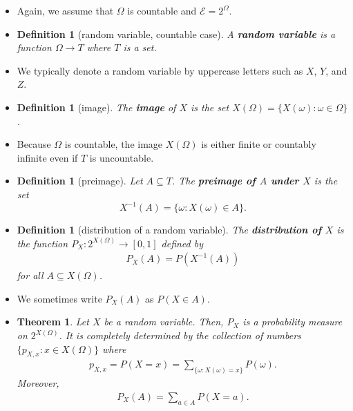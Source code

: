 \documentclass[10pt]{article}
\newtheorem{theorem}[lemma]{Theorem}
\newtheorem{definition}[lemma]{Definition}
\numberwithin{lemma}{section}
\newcommand{\mcal}[1]{\mathcal{#1}}
\begin{document}
\begin{itemize}
  \item Again, we assume that $\Omega$ is countable and $\mcal{E} = 2^\Omega$.

  \item \begin{definition}[random variable, countable case]
    A {\bf random variable} is a function $\Omega \rightarrow T$ where $T$ is a set.
  \end{definition}

  \item We typically denote a random variable by uppercase letters such as $X$, $Y$, and $Z$.
  
  \item \begin{definition}[image]
    The {\bf image} of $X$ is the set $X(\Omega) = \{ X(\omega) : \omega \in \Omega \}$.
  \end{definition}
  
  \item Because $\Omega$ is countable, the image $X(\Omega)$ is either finite or countably infinite even if $T$ is uncountable.
  
  \item \begin{definition}[preimage]
    Let $A \subseteq T$. The {\bf preimage of $A$ under $X$} is the set $$X^{-1}(A) = \{ \omega : X(\omega) \in A \}.$$
  \end{definition}

  \item \begin{definition}[distribution of a random variable]
    The {\bf distribution of $X$} is the function $P_X: 2^{X(\Omega)} \rightarrow [0,1]$ defined by
    \begin{align*}
      P_X(A) = P(X^{-1}(A))
    \end{align*}
    for all $A \subseteq X(\Omega)$.
  \end{definition}
  
  \item We sometimes write $P_X(A)$ as $P(X \in A)$.
  
  \item \begin{theorem}
    Let $X$ be a random variable. Then, $P_X$ is a probability measure on $2^{X(\Omega)}$. It is completely determined by the collection of numbers $\{ p_{X,x} : x \in X(\Omega )\}$ where
    \begin{align*}
      p_{X,x} = P(X = x) = \sum_{\{ \omega: X(\omega) = x \}} P(\omega).
    \end{align*}
    Moreover,
    \begin{align*}
      P_X(A) = \sum_{a \in A} P(X = a).
    \end{align*}
  \end{theorem}
\end{itemize}
\end{document}
